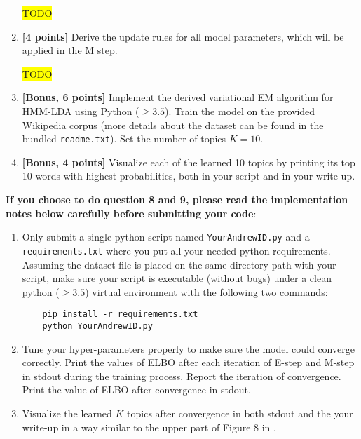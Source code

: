 \documentclass[10pt]{article}
\newcommand{\hilight}[1]{\colorbox{yellow}{#1}}
\begin{document}
\begin{enumerate}
\begin{solution}
\hilight{TODO}
\end{solution}

    \item \textbf{[4 points]} Derive the update rules for all model parameters, which will be applied in the M step.

\begin{solution}
\hilight{TODO}
\end{solution}

    \item \textbf{[Bonus, 6 points]} Implement the derived variational EM algorithm for HMM-LDA using Python ($\ge 3.5$). Train the model on the provided Wikipedia corpus (more details about the dataset can be found in the bundled \texttt{readme.txt}). Set the number of topics $K = 10$.

    \item \textbf{[Bonus, 4 points]} Visualize each of the learned 10 topics by printing its top 10 words with highest probabilities, both in your script and in your write-up.
\end{enumerate}


\textbf{If you choose to do question 8 and 9, please read the implementation notes below carefully before submitting your code}:
    \begin{enumerate}
    \item Only submit a single python script named \texttt{YourAndrewID.py} and a \texttt{requirements.txt} where you put all your needed python requirements. Assuming the dataset file is placed on the same directory path with your script, make sure your script is executable (without bugs) under a clean python ($\ge 3.5$) virtual environment with the following two commands:
    \begin{verbatim}
    pip install -r requirements.txt
    python YourAndrewID.py
    \end{verbatim}
     \item Tune your hyper-parameters properly to make sure the model could converge correctly. Print the values of ELBO after each iteration of E-step and M-step in stdout during the training process. Report the iteration of convergence. Print the value of ELBO after convergence in stdout.
     \item Visualize the learned $K$ topics after convergence in both stdout and the your write-up in a way similar to the upper part of Figure 8 in \cite{blei2003latent}.
    \end{enumerate}
\end{document}
